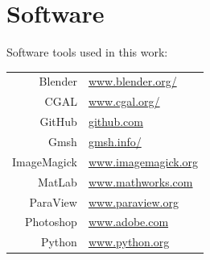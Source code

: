 \documentclass[a4paper,10pt]{article}
\begin{document}
\section{Software}
Software tools used in this work:
\begin{table}[H]
\begin{tabular}{rl}
Blender &\url{www.blender.org/}\\
CGAL &\url{www.cgal.org/}\\
GitHub &\url{github.com}\\
Gmsh &\url{gmsh.info/}\\
ImageMagick &\url{www.imagemagick.org}\\
MatLab &\url{www.mathworks.com}\\
ParaView &\url{www.paraview.org}\\
Photoshop &\url{www.adobe.com}\\
Python &\url{www.python.org}\\
\end{tabular}
\end{table}
\end{document}
